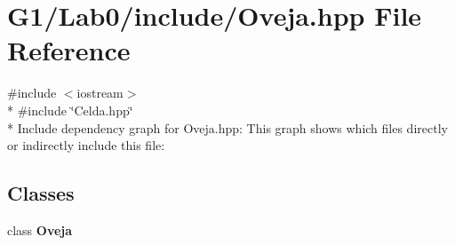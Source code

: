 \section{G1/\+Lab0/include/\+Oveja.hpp File Reference}
\label{_oveja_8hpp}
{\ttfamily \#include $<$iostream$>$}\\*
{\ttfamily \#include \char`\"{}Celda.\+hpp\char`\"{}}\\*
Include dependency graph for Oveja.\+hpp\+:
This graph shows which files directly or indirectly include this file\+:
\subsection*{Classes}
\begin{DoxyCompactItemize}
\item 
class {\bf Oveja}
\end{DoxyCompactItemize}
